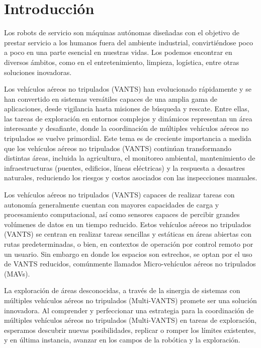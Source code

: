 \chapter{Introducción}

Los robots de servicio son máquinas autónomas diseñadas con el objetivo de prestar servicio a los humanos fuera del ambiente industrial, convirtiéndose poco a poco en una parte esencial en nuestras vidas. Los podemos encontrar en diversos ámbitos, como en el entretenimiento, limpieza, logística, entre otras soluciones inovadoras.

Los vehículos aéreos no tripulados (VANTS) han evolucionado rápidamente y se han convertido en sistemas versátiles capaces de una amplia gama de aplicaciones, desde vigilancia hasta misiones de búsqueda y rescate. Entre ellas, las tareas de exploración en entornos complejos y dinámicos representan un área interesante y desafiante, donde la coordinación de múltiples vehículos aéreos no tripulados se vuelve primordial. Este tema es de creciente importancia a medida que los vehículos aéreos no tripulados (VANTS) continúan transformando distintas áreas, incluida la agricultura, el monitoreo ambiental, mantenimiento de infraestructuras (puentes, edificios, líneas eléctricas) y la respuesta a desastres naturales, reduciendo los riesgos y costos asociados con las inspecciones manuales.

Los vehículos aéreos no tripulados (VANTS) capaces de realizar tareas con autonomía generalmente cuentan con mayores capacidades de carga y procesamiento computacional, así como sensores capaces de percibir grandes volúmenes de datos en un tiempo reducido. Estos vehículos aéreos no tripulados (VANTS) se centran en realizar tareas sencillas y estáticas en áreas abiertas con rutas predeterminadas, o bien, en contextos de operación por control remoto por un usuario. Sin embargo en donde los espacios son estrechos, se optan por el uso de VANTS reducidos, comúnmente llamados Micro-vehículos aéreos no tripulados (MAVs).

La exploración de áreas desconocidas, a través de la sinergia de sistemas con múltiples vehículos aéreos no tripulados (Multi-VANTS) promete ser una solución innovadora. Al comprender y perfeccionar una estrategia para la coordinación de múltiples vehículos aéreos no tripulados (Multi-VANTS) en tareas de exploración, esperamos descubrir nuevas posibilidades, replicar o romper los límites existentes, y en última instancia, avanzar en los campos de la robótica y la exploración.

